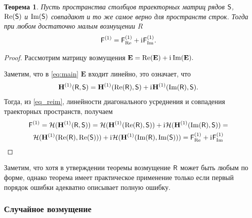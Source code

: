 \documentclass[specialist,
               substylefile = spbu.rtx,
               subf,href,colorlinks=true, 12pt]{disser}
\newtheorem{theorem}{Теорема}
\newtheorem*{notice*}{Замечание}
\DeclareMathOperator{\rk}{rk}
\begin{document}
\begin{theorem}\label{th:sum}
	Пусть пространства столбцов траекторных матриц рядов $\textsf{S}$, $\Re(\textsf{S})$ и $\Im(\textsf{S})$ совпадают и то же самое верно для пространств строк.
	Тогда при любом достаточно малым возмущении $R$ $$\textsf{F}^{(1)} = \textsf{F}^{(1)}_{\Re} + \mathrm{i}\mkern1mu\textsf{F}^{(1)}_{\Im}.$$
\end{theorem}
\begin{proof}
	Рассмотрим матрицу возмущения $\mathbf{E} = \Re(\mathbf{E}) + \mathrm{i}\mkern1mu\Im(\mathbf{E}).$
	
	Заметим, что в \eqref{eq:main} $\mathbf{E}$ входит линейно, это означает, что
	\begin{equation} \label{eq_reim}
		\mathbf{H}^{(1)}(\textsf{R}, \textsf{S}) = \mathbf{H}^{(1)}(\Re(\textsf{R}), \textsf{S}) + \mathrm{i}\mkern1mu\mathbf{H}^{(1)}(\Im(\textsf{R}), \textsf{S}).
	\end{equation}
	Тогда, из \eqref{eq_reim}, линейности диагонального усреднения и  совпадения траекторных пространств, получаем
	\begin{multline*}
		\textsf{F}^{(1)} = \mathcal{H}(\mathbf{H}^{(1)}(\textsf{R}, \textsf{S})) = \mathcal{H}(\mathbf{H}^{(1)}(\Re(\textsf{R}), \textsf{S})) + \mathrm{i}\mkern1mu\mathcal{H}(\mathbf{H}^{(1)}(\Im(\textsf{R}), \textsf{S})) =\\
		\mathcal{H}(\mathbf{H}^{(1)}(\Re(\textsf{R}), \Re(\textsf{S}))) + \mathrm{i}\mkern1mu\mathcal{H}(\mathbf{H}^{(1)}(\Im(\textsf{R}), \Im(\textsf{S}))) = \textsf{F}^{(1)}_{\Re} + \mathrm{i}\mkern1mu\textsf{F}^{(1)}_{\Im}	
	\end{multline*}
	
\end{proof}

Заметим, что хотя в утверждении теоремы возмущение $\textsf{R}$ может быть любым по форме, однако теорема имеет практическое применение только если первый порядок ошибки адекватно описывает полную ошибку.




\subsubsection{Случайное возмущение}
\end{document}
